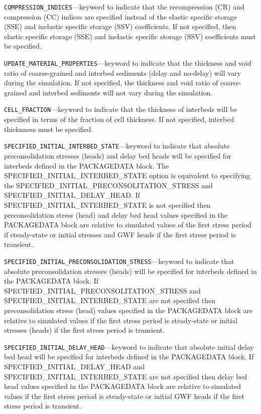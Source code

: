 \begin{description}
\item \texttt{COMPRESSION\_INDICES}---keyword to indicate that the recompression (CR) and compression (CC) indices are specified instead of the elastic specific storage (SSE) and inelastic specific storage (SSV) coefficients. If not specified, then elastic specific storage (SSE) and inelastic specific storage (SSV) coefficients must be specified.

\item \texttt{UPDATE\_MATERIAL\_PROPERTIES}---keyword to indicate that the thickness and void ratio of coarse-grained and interbed sediments (delay and no-delay) will vary during the simulation. If not specified, the thickness and void ratio of coarse-grained and interbed sediments will not vary during the simulation.

\item \texttt{CELL\_FRACTION}---keyword to indicate that the thickness of interbeds will be specified in terms of the fraction of cell thickness. If not specified, interbed thicknness must be specified.

\item \texttt{SPECIFIED\_INITIAL\_INTERBED\_STATE}---keyword to indicate that absolute preconsolidation stresses (heads) and delay bed heads will be specified for interbeds defined in the PACKAGEDATA block. The SPECIFIED\_INITIAL\_INTERBED\_STATE option is equivalent to specifying the SPECIFIED\_INITIAL\_PRECONSOLITATION\_STRESS and SPECIFIED\_INITIAL\_DELAY\_HEAD. If SPECIFIED\_INITIAL\_INTERBED\_STATE is not specified then preconsolidation stress (head) and delay bed head values specified in the PACKAGEDATA block are relative to simulated values of the first stress period if steady-state or initial stresses and GWF heads if the first stress period is transient.

\item \texttt{SPECIFIED\_INITIAL\_PRECONSOLIDATION\_STRESS}---keyword to indicate that absolute preconsolidation stresses (heads) will be specified for interbeds defined in the PACKAGEDATA block. If SPECIFIED\_INITIAL\_PRECONSOLITATION\_STRESS and SPECIFIED\_INITIAL\_INTERBED\_STATE are not specified then preconsolidation stress (head) values specified in the PACKAGEDATA block are relative to simulated values if the first stress period is steady-state or initial stresses (heads) if the first stress period is transient.

\item \texttt{SPECIFIED\_INITIAL\_DELAY\_HEAD}---keyword to indicate that absolute initial delay bed head will be specified for interbeds defined in the PACKAGEDATA block. If SPECIFIED\_INITIAL\_DELAY\_HEAD and SPECIFIED\_INITIAL\_INTERBED\_STATE are not specified then delay bed head values specified in the PACKAGEDATA block are relative to simulated values if the first stress period is steady-state or initial GWF heads if the first stress period is transient.


\end{description}
